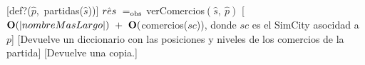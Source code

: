 \begin{Interfaz}
    [def?($\hat{p}$,\ partidas($\hat{s}$))]
    {$\hat{res}\ \igobs\ $verComercios$(\hat{s},\ \hat{p})$}
    [$\bold{O}(|nombreMasLargo|)\ +\ \bold{O}($comercios($sc$)), donde $sc$ es el SimCity asocidad a $p$]
    [Devuelve un diccionario con las posiciones y niveles de los comercios de la partida]
    [Devuelve una copia.]

\end{Interfaz}
